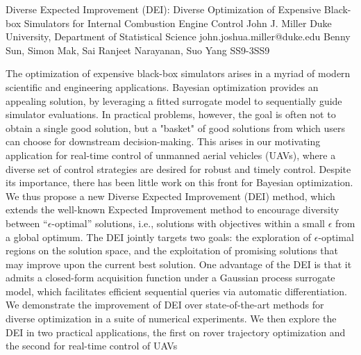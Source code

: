 \begin{talk}
  {Diverse Expected Improvement (DEI): Diverse Optimization of Expensive Black-box Simulators for Internal Combustion Engine Control}%
  {John J. Miller}%
  {Duke University, Department of Statistical Science}%
  {john.joshua.miller@duke.edu}%
  {Benny Sun, Simon Mak, Sai Ranjeet Narayanan, Suo Yang}%
{}{}{SS9-3}{SS9}

			
The optimization of expensive black-box simulators arises in a myriad of modern scientific and engineering applications. Bayesian optimization provides an appealing solution, by leveraging a fitted surrogate model to sequentially guide simulator evaluations. In practical problems, however, the goal is often not to obtain a single good solution, but a "basket" of good solutions from which users can choose for downstream decision-making. This arises in our motivating application for real-time control of unmanned aerial vehicles (UAVs), where a diverse set of control strategies are desired for robust and timely control. Despite its importance, there has been little work on this front for Bayesian optimization. We thus propose a new Diverse Expected Improvement (DEI) method, which extends the well-known Expected Improvement method to encourage diversity between ``$\epsilon$-optimal'' solutions, i.e., solutions with objectives within a small $\epsilon$ from a global optimum. The DEI jointly targets two goals: the exploration of $\epsilon$-optimal regions on the solution space, and the exploitation of promising solutions that may improve upon the current best solution. One advantage of the DEI is that it admits a closed-form acquisition function under a Gaussian process surrogate model, which facilitates efficient sequential queries via automatic differentiation. We demonstrate the improvement of DEI over state-of-the-art methods for diverse optimization in a suite of numerical experiments. We then explore the DEI in two practical applications, the first on rover trajectory optimization and the second for real-time control of UAVs



\end{talk}

